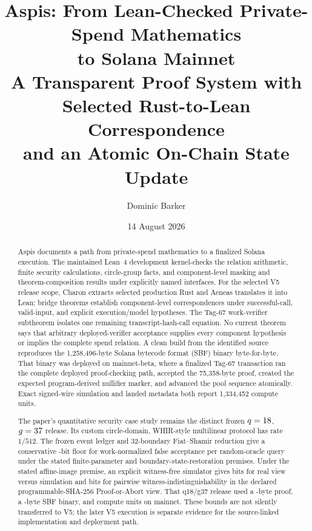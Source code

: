 \documentclass[11pt]{article}
\title{Aspis: From Lean-Checked Private-Spend Mathematics\\
to Solana Mainnet\\[0.4em]
{\large A Transparent Proof System with Selected Rust-to-Lean Correspondence\\
and an Atomic On-Chain State Update}}
\author{Dominic Barker}
\date{14 August 2026}
\theoremstyle{definition}
\theoremstyle{remark}
\begin{document}
\maketitle

\begin{abstract}
Aspis documents a path from private-spend mathematics to a
finalized Solana execution.  The maintained Lean~4 development kernel-checks
the relation arithmetic, finite security calculations, circle-group facts,
and component-level masking and theorem-composition results under explicitly
named interfaces.  For the selected V5 release scope, Charon extracts selected
production Rust and Aeneas translates it into Lean; bridge theorems establish
component-level correspondences under successful-call, valid-input, and
explicit execution/model hypotheses.  The Tag-67 work-verifier subtheorem
isolates one remaining transcript-hash-call equation.  No current theorem says
that arbitrary deployed-verifier acceptance supplies every component
hypothesis or implies the complete spend relation.  A clean build from the
identified source reproduces
the 1,258,496-byte Solana bytecode format (SBF) binary byte-for-byte.  That
binary was deployed on mainnet-beta, where a finalized Tag-67 transaction ran
the complete deployed proof-checking path, accepted the 75,358-byte proof,
created the expected program-derived nullifier marker, and advanced the pool
sequence atomically.  Exact signed-wire simulation and
landed metadata both report 1,334,452 compute units.

The paper's quantitative security case study remains the distinct frozen
$q=18$, $g=37$ release.  Its custom
circle-domain, WHIR-style multilinear protocol has rate $1/512$.  The frozen
event ledger and 32-boundary Fiat--Shamir reduction give a conservative
\ProfileSoundnessBits-bit floor for work-normalized false acceptance per
random-oracle query under the stated finite-parameter and
boundary-state-restoration premises.  Under the stated affine-image premise,
an explicit witness-free simulator gives \ProfileSimulationBits{} bits for
real view versus simulation and \ProfilePairwiseBits{} bits for pairwise
witness-indistinguishability in the declared programmable-SHA-256
Proof-or-Abort view.  That q18/g37 release used a
\ProfileProofBytes-byte proof, a \ProfileSbfBytes-byte SBF binary, and
\ProfileMainnetComputeUnits{} compute units on mainnet.  These bounds are not
silently transferred to V5; the later V5 execution is separate evidence for
the source-linked implementation and deployment path.


\end{abstract}
\end{document}
